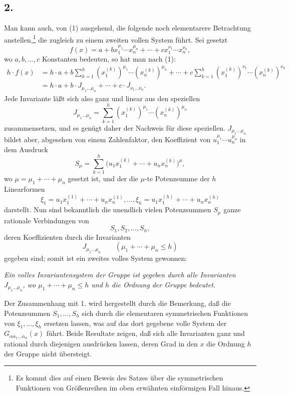\documentclass[11pt]{article}
\begin{document}
\subsection*{2.}
Man kann auch, von (1) ausgehend, die folgende noch elementarere Betrachtung anstellen,\footnote{Es kommt dies auf einen Beweis des Satzes über die symmetrischen Funktionen von Größenreihen im oben erwähnten einförmigen Fall hinaus.} die zugleich zu einem zweiten vollen System führt. Sei gesetzt
\[
  f(x)=a+b x_1^{\mu_1}\cdots x_n^{\mu_n}
       +\cdots+c x_1^{\nu_1}\cdots x_n^{\nu_n},
\]
wo $a,b,\ldots,c$ Konstanten bedeuten, so hat man nach (1):
\[
\begin{aligned}
 h\cdot f(x)
 &=h\cdot a+b\sum_{k=1}^{h}(x_1^{(k)})^{\mu_1}\cdots(x_n^{(k)})^{\mu_n}
     +\cdots
     +c\sum_{k=1}^{h}(x_1^{(k)})^{\nu_1}\cdots(x_n^{(k)})^{\nu_n} \\
 &=h\cdot a+b\cdot J_{\mu_1\ldots\mu_n}+\cdots+c\cdot J_{\nu_1\ldots\nu_n}.
\end{aligned}
\]
Jede Invariante läßt sich also ganz und linear aus den speziellen
\[
  J_{\mu_1\ldots\mu_n}
  =\sum_{k=1}^{h}(x_1^{(k)})^{\mu_1}\cdots(x_n^{(k)})^{\mu_n}
\]
zusammensetzen, und es genügt daher der Nachweis für diese speziellen. $J_{\mu_1\ldots\mu_n}$ bildet aber, abgesehen von einem Zahlenfaktor, den Koeffizient von $u_1^{\mu_1}\cdots u_n^{\mu_n}$ in dem Ausdruck
\[
  S_\mu=\sum_{k=1}^{h}
  \bigl(u_1x_1^{(k)}+\cdots+u_nx_n^{(k)}\bigr)^{\mu},
\]
wo $\mu=\mu_1+\cdots+\mu_n$ gesetzt ist, und der die $\mu$-te Potenzsumme der $h$ Linearformen
\[
  \xi_1=u_1x_1^{(1)}+\cdots+u_nx_n^{(1)},\ldots,
  \xi_h=u_1x_1^{(h)}+\cdots+u_nx_n^{(h)}
\]
darstellt. Nun sind bekanntlich die unendlich vielen Potenzsummen $S_\mu$ ganze rationale Verbindungen von
\[
  S_1,S_2,\ldots,S_h,
\]
deren Koeffizienten durch die Invarianten
\[
  J_{\mu_1\ldots\mu_n}\qquad(\mu_1+\cdots+\mu_n\le h)
\]
gegeben sind; somit ist ein zweites volles System gewonnen:

\emph{Ein volles Invariantensystem der Gruppe ist gegeben durch alle Invarianten $J_{\mu_1\ldots\mu_n}$, wo $\mu_1+\cdots+\mu_n\le h$ und $h$ die Ordnung der Gruppe bedeutet.}

Der Zusammenhang mit 1. wird hergestellt durch die Bemerkung, daß die Potenzsummen $S_1,\ldots,S_h$ sich durch die elementaren symmetrischen Funktionen von $\xi_1,\ldots,\xi_h$ ersetzen lassen, was auf das dort gegebene volle System der $G_{\alpha\alpha_1\ldots\alpha_n}(x)$ führt. Beide Resultate zeigen, daß sich alle Invarianten ganz und rational durch diejenigen ausdrücken lassen, deren Grad in den $x$ die Ordnung $h$ der Gruppe nicht übersteigt.
\end{document}
